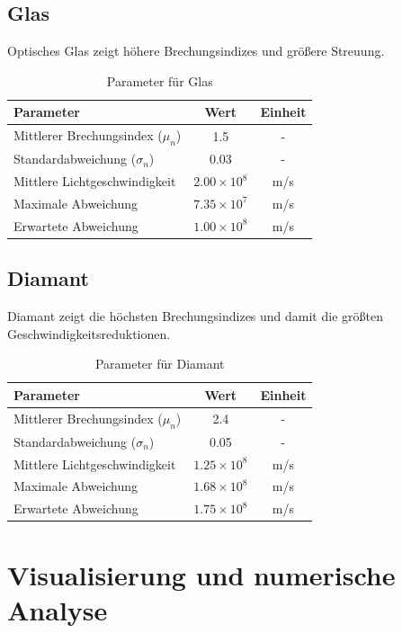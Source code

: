 \documentclass[a4paper,12pt]{article}
\theoremstyle{definition}
\theoremstyle{remark}
\begin{document}
\subsection{Glas}

Optisches Glas zeigt höhere Brechungsindizes und größere Streuung.

\begin{table}[h]
\centering
\begin{tabular}{|l|c|c|}
\toprule
\textbf{Parameter} & \textbf{Wert} & \textbf{Einheit} \\
\midrule
Mittlerer Brechungsindex ($\mu_n$) & 1.5 & - \\
Standardabweichung ($\sigma_n$) & 0.03 & - \\
Mittlere Lichtgeschwindigkeit & $2.00 \times 10^8$ & m/s \\
Maximale Abweichung & $7.35 \times 10^7$ & m/s \\
Erwartete Abweichung & $1.00 \times 10^8$ & m/s \\
\bottomrule
\end{tabular}
\caption{Parameter für Glas}
\end{table}

\subsection{Diamant}

Diamant zeigt die höchsten Brechungsindizes und damit die größten Geschwindigkeitsreduktionen.

\begin{table}[h]
\centering
\begin{tabular}{|l|c|c|}
\toprule
\textbf{Parameter} & \textbf{Wert} & \textbf{Einheit} \\
\midrule
Mittlerer Brechungsindex ($\mu_n$) & 2.4 & - \\
Standardabweichung ($\sigma_n$) & 0.05 & - \\
Mittlere Lichtgeschwindigkeit & $1.25 \times 10^8$ & m/s \\
Maximale Abweichung & $1.68 \times 10^8$ & m/s \\
Erwartete Abweichung & $1.75 \times 10^8$ & m/s \\
\bottomrule
\end{tabular}
\caption{Parameter für Diamant}
\end{table}

\section{Visualisierung und numerische Analyse}
\end{document}
